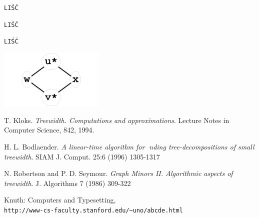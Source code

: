 \documentclass[12pt, oneside]{report}
\begin{document}
\texttt{LIŚĆ} \newline

\texttt{LIŚĆ} \newline

\texttt{LIŚĆ} \newline

\begin{center}
\includegraphics[width=5cm]{square_graph.png}
\end{center}


\newpage
	\begin{thebibliography}{9}
			T. Kloks. 
			\textit{Treewidth. Computations and approximations}. 
			Lecture Notes in Computer Science, 842, 1994.
 
			H. L. Bodlaender. 
			\textit{A linear-time algorithm for nding tree-decompositions of small treewidth}. 
			SIAM J. Comput. 25:6 (1996) 1305-1317
			
			N. Robertson and P. D. Seymour. 
			\textit{Graph Minors II. Algorithmic aspects of treewidth}. 
			J. Algorithms 7 (1986) 309-322
 
			Knuth: Computers and Typesetting,
			\\\texttt{http://www-cs-faculty.stanford.edu/\~{}uno/abcde.html}
	\end{thebibliography} 
\end{document}
